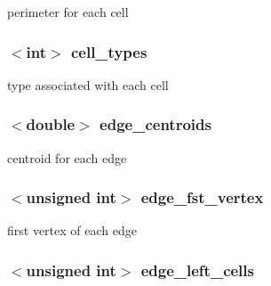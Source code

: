 perimeter for each cell 

\hypertarget{classFVL_1_1CFVMesh2D_a373a520b2d4015b9602a58759dcd39cd}{
\subsubsection[{cell\_\-types}]{$<$int$>$ {\bf cell\_\-types}}}
\label{da/d8d/classFVL_1_1CFVMesh2D_a373a520b2d4015b9602a58759dcd39cd}


type associated with each cell 

\hypertarget{classFVL_1_1CFVMesh2D_a3d6b698a768743ed6a78ab1603146522}{
\subsubsection[{edge\_\-centroids}]{$<$double$>$ {\bf edge\_\-centroids}}}
\label{da/d8d/classFVL_1_1CFVMesh2D_a3d6b698a768743ed6a78ab1603146522}


centroid for each edge 

\hypertarget{classFVL_1_1CFVMesh2D_a21b745a28be501c6f6e79d4cef3ef779}{
\subsubsection[{edge\_\-fst\_\-vertex}]{$<$unsigned int$>$ {\bf edge\_\-fst\_\-vertex}}}
\label{da/d8d/classFVL_1_1CFVMesh2D_a21b745a28be501c6f6e79d4cef3ef779}


first vertex of each edge 

\hypertarget{classFVL_1_1CFVMesh2D_a9fc942016b70da68970d941850fc4328}{
\subsubsection[{edge\_\-left\_\-cells}]{$<$unsigned int$>$ {\bf edge\_\-left\_\-cells}}}
\label{da/d8d/classFVL_1_1CFVMesh2D_a9fc942016b70da68970d941850fc4328}


